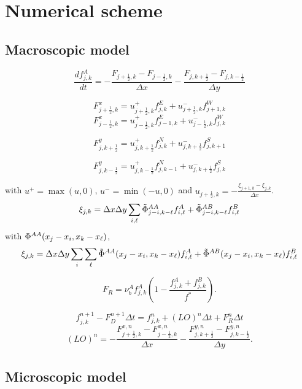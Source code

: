 	\section{Numerical scheme}
	\subsection{Macroscopic model}





\begin{equation}
\frac{d f^{A}_{j,k}}{dt}= -\frac{F_{j+\frac{1}{2},k}-F_{j-\frac{1}{2},k}}{\Delta x}-\frac{F_{j,k+\frac{1}{2}}-F_{j,k-\frac{1}{2}}}{\Delta y}
\end{equation}

$$ F^{x}_{j+\frac{1}{2},k}=u^{+}_{j+\frac{1}{2},k}f^{E}_{j,k}+
u^{-}_{j+\frac{1}{2},k}f^{W}_{j+1,k}   $$
$$ F^{x}_{j-\frac{1}{2},k}=u^{+}_{j-\frac{1}{2},k}f^{E}_{j-1,k}+
u^{-}_{j-\frac{1}{2},k}f^{W}_{j,k}   $$

$$ F^{y}_{j,k+\frac{1}{2}}=u^{+}_{j,k+\frac{1}{2}}f^{N}_{j,k}+
u^{-}_{j,k+\frac{1}{2}}f^{S}_{j,k+1}   $$

$$ F^{y}_{j,k-\frac{1}{2}}=u^{+}_{j,k-\frac{1}{2}}f^{N}_{j,k-1}+
u^{-}_{j,k+\frac{1}{2}}f^{S}_{j,k}   $$

with $u^{+}=\max(u,0)$, $u^{-}=\min(-u,0)$ and $u_{j+\frac{1}{2},k}=-\frac{\xi_{j+1,k}-\xi_{j,k}}{\Delta x}$. \\

$$ \xi_{j,k}=\Delta x \Delta y \sum_{i,{\ell}} \tilde{\Phi}^{AA}_{j-i,k-{\ell}} f^{A}_{i,{\ell}}+
\tilde{\Phi}^{AB}_{j-i,k-{\ell}} f^{B}_{i,{\ell}} $$
with ${\Phi}^{AA}(x_j-x_i,x_k-x_{{\ell}})$,
$$ \xi_{j,k}=\Delta x \Delta y \sum_{i} \sum_{{\ell}} \tilde{\Phi}^{AA}(x_{j}-x_{i},x_{k}-x_{{\ell}}) f^{A}_{i,{\ell}}+
\tilde{\Phi}^{AB}(x_{j}-x_{i},x_{k}-x_{{\ell}}) f^{B}_{i,{\ell}} $$

$$ F_R=\nu_b^{A}f^{A}_{j,k}\left(1-\frac{f^{A}_{j,k}+f^{B}_{j,k}}{f^{*}}\right). $$

\begin{equation}
	f_{j,k}^{n+1}-F_{D}^{n+1} \Delta t= f_{j,k}^{n}+(LO)^{n} \Delta t + F_{R}^{n} \Delta t
\end{equation}
 $$(LO)^{n}=-\frac{F^{x,n}_{j+\frac{1}{2},k}-F^{x,n}_{j-\frac{1}{2},k}}{\Delta x}-\frac{F^{y,n}_{j,k+\frac{1}{2}}-F^{y,n}_{j,k-\frac{1}{2}}}{\Delta y}.	$$
\subsection{Microscopic model}




